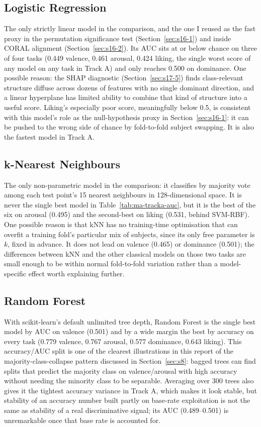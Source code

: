 \documentclass[11pt]{report}
\begin{document}
\subsection{Logistic Regression}
\label{sec:ma-lr}
The only strictly linear model in the comparison, and the one I reused as
the fast proxy in the permutation significance test (Section~\ref{sec:s16-1})
and inside CORAL alignment (Section~\ref{sec:s16-2}). Its AUC sits at or
below chance on three of four tasks (0.449 valence, 0.461 arousal, 0.424
liking, the single worst score of any model on any task in Track A) and
only reaches 0.500 on dominance. One possible reason: the SHAP diagnostic
(Section~\ref{sec:s17-5}) finds class-relevant structure diffuse across
dozens of features with no single dominant direction, and a linear
hyperplane has limited ability to combine that kind of structure into a
useful score. Liking's especially poor score, meaningfully below 0.5, is
consistent with this model's role as the null-hypothesis proxy in
Section~\ref{sec:s16-1}: it can be pushed to the wrong side of chance by
fold-to-fold subject swapping. It is also the fastest model in Track A.

\subsection{k-Nearest Neighbours}
The only non-parametric model in the comparison: it classifies by majority
vote among each test point's 15 nearest neighbours in 128-dimensional space.
It is never the single best model in Table~\ref{tab:ma-tracka-auc}, but it
is the best of the six on arousal (0.495) and the second-best on liking
(0.531, behind SVM-RBF). One possible reason is that kNN has no
training-time optimisation that can overfit a training fold's particular
mix of subjects, since its only free parameter is $k$, fixed in advance.
It does not lead on valence (0.465) or dominance (0.501); the differences
between kNN and the other classical models on those two tasks are small
enough to be within normal fold-to-fold variation rather than a
model-specific effect worth explaining further.

\subsection{Random Forest}
\label{sec:ma-rf}
With scikit-learn's default unlimited tree depth, Random Forest is the
single best model by AUC on valence (0.501) and by a wide margin the best by
accuracy on every task (0.779 valence, 0.767 arousal, 0.577 dominance, 0.643
liking). This accuracy/AUC split is one of the clearest illustrations in
this report of the majority-class-collapse pattern discussed in
Section~\ref{sec:s8}: bagged trees can find splits that predict the
majority class on valence/arousal with high accuracy without needing the
minority class to be separable. Averaging over 300 trees also gives it the
tightest accuracy variance in Track A, which makes it look stable, but
stability of an accuracy number built partly on base-rate exploitation is
not the same as stability of a real discriminative signal; its AUC
(0.489--0.501) is unremarkable once that base rate is accounted for.
\end{document}
